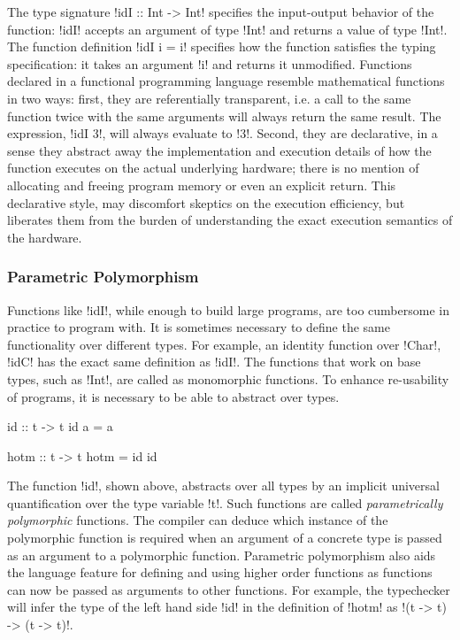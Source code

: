\documentclass[screen,nonacm]{acmart}
\begin{document}
The type signature !idI :: Int -> Int! specifies the input-output behavior of the
function: !idI! accepts an argument of type !Int! and returns a value of type !Int!. The
function definition !idI i = i! specifies how the function satisfies the typing
specification: it takes an argument !i! and returns it unmodified. Functions declared in a
functional programming language resemble mathematical functions in two ways: first, they
are referentially transparent, i.e. a call to the same function twice with the same
arguments will always return the same result. The expression, !idI 3!, will always
evaluate to !3!. Second, they are declarative, in a sense they abstract away the
implementation and execution details of how the function executes on the actual underlying
hardware; there is no mention of allocating and freeing program memory or even an explicit
return. This declarative style, may discomfort skeptics on the execution efficiency, but
liberates them from the burden of understanding the exact execution semantics of the
hardware.

\subsubsection{Parametric Polymorphism}
Functions like !idI!, while enough to build large programs, are too cumbersome in
practice to program with. It is sometimes necessary to define the same functionality over
different types. For example, an identity function over !Char!, !idC! has the exact same
definition as !idI!. The functions that work on base types, such as !Int!, are called as
monomorphic functions. To enhance re-usability of programs, it is necessary to be able to
abstract over types.


\begin{minipage}{0.5\linewidth}
\begin{CenteredBox}
\begin{code}
id :: t -> t
id a = a
\end{code}
\end{CenteredBox}
\end{minipage}%
\begin{minipage}[ht]{0.5\linewidth}
\begin{CenteredBox}
\begin{code}
hotm :: t -> t
hotm = id id
\end{code}
\end{CenteredBox}
\end{minipage}

The function !id!, shown above, abstracts over all types by an implicit universal
quantification over the type variable !t!. Such functions are called \emph{parametrically
polymorphic} functions\cite{strachey_fundamental_2000}. The compiler
can deduce which instance of the polymorphic function is required when
an argument of a concrete type is passed as an argument to a
polymorphic function. Parametric polymorphism also aids the language feature for defining and using
higher order functions as functions can now be passed as arguments to other
functions. For example, the typechecker will infer the type of the
left hand side !id! in the definition of !hotm! as !(t -> t) -> (t -> t)!.
\end{document}
